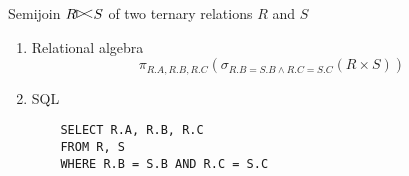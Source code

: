 Semijoin $R \leftsemijoin S$ of two ternary relations $R$ and $S$

\begin{enumerate} 
  \item Relational algebra
  \begin{equation*}
    \pi_{R.A,R.B,R.C}(\sigma_{R.B=S.B \land R.C=S.C}(R \times S))
  \end{equation*}

  \item SQL
  \begin{verbatim}
    SELECT R.A, R.B, R.C 
    FROM R, S
    WHERE R.B = S.B AND R.C = S.C
  \end{verbatim}
\end{enumerate}